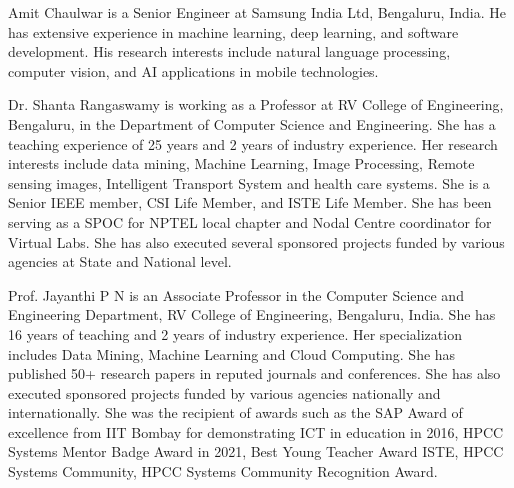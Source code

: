 \documentclass{ieeeaccess}
\begin{document}
\vspace{-2.5cm}
\begin{IEEEbiography}{Amit Chaulwar} is a Senior Engineer at Samsung India Ltd, Bengaluru, India. He has extensive experience in machine learning, deep learning, and software development. His research interests include natural language processing, computer vision, and AI applications in mobile technologies.
\end{IEEEbiography}

\vspace{-1.5cm}
\begin{IEEEbiography}{Dr. Shanta Rangaswamy} is working as a Professor at RV College of Engineering, Bengaluru, in the Department of Computer Science and Engineering. She has a teaching experience of 25 years and 2 years of industry experience. Her research interests include data mining, Machine Learning, Image Processing, Remote sensing images, Intelligent Transport System and health care systems. She is a Senior IEEE member, CSI Life Member, and ISTE Life Member. She has been serving as a SPOC for NPTEL local chapter and Nodal Centre coordinator for Virtual Labs. She has also executed several sponsored projects funded by various agencies at State and National level.
\end{IEEEbiography}

\vspace{-1.5cm}
\begin{IEEEbiography}{Prof. Jayanthi P N} is an Associate Professor in the Computer Science and Engineering Department, RV College of Engineering, Bengaluru, India. She has 16 years of teaching and 2 years of industry experience. Her specialization includes Data Mining, Machine Learning and Cloud Computing. She has published 50+ research papers in reputed journals and conferences. She has also executed sponsored projects funded by various agencies nationally and internationally. She was the recipient of awards such as the SAP Award of excellence from IIT Bombay for demonstrating ICT in education in 2016, HPCC Systems Mentor Badge Award in 2021, Best Young Teacher Award ISTE, HPCC Systems Community, HPCC Systems Community Recognition Award.
\end{IEEEbiography}

\setlength{\parskip}{\baselineskip}

\EOD
\end{document}

